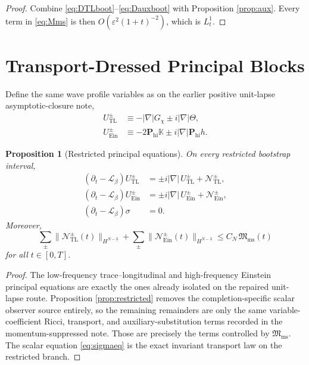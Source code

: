 \documentclass[11pt]{article}
\newcommand{\Ell}{\mathcal{L}}
\newtheorem{proposition}{Proposition}
\begin{document}
\begin{proof}
Combine \eqref{eq:DTLboot}--\eqref{eq:Dauxboot} with Proposition \ref{prop:aux}. Every term in \eqref{eq:Mms} is then \(O(\varepsilon^2(1+t)^{-2})\), which is \(L_t^1\).
\end{proof}

\section{Transport-Dressed Principal Blocks}

Define the same wave profile variables as on the earlier positive unit-lapse asymptotic-closure note,
\begin{align}
U_{\mathrm{TL}}^\pm
&\equiv
-|\nabla|G_\chi \pm i|\nabla|\Theta,
\label{eq:UTL}
\\
U_{\mathrm{Ein}}^\pm
&\equiv
-2\mathbf P_{\mathrm{hi}}\mathbb K
\pm i|\nabla|\mathbf P_{\mathrm{hi}}h.
\label{eq:UEin}
\end{align}

\begin{proposition}[Restricted principal equations]
\label{prop:principal}
On every restricted bootstrap interval,
\begin{align}
(\partial_t-\Ell_\beta)U_{\mathrm{TL}}^\pm
&=
\pm i|\nabla|\,U_{\mathrm{TL}}^\pm
+ \mathcal N_{\mathrm{TL}}^\pm,
\label{eq:UTLeq}
\\
(\partial_t-\Ell_\beta)U_{\mathrm{Ein}}^\pm
&=
\pm i|\nabla|\,U_{\mathrm{Ein}}^\pm
+ \mathcal N_{\mathrm{Ein}}^\pm,
\label{eq:UEineq}
\\
(\partial_t-\Ell_\beta)\sigma
&=0.
\label{eq:sigmaeq}
\end{align}
Moreover,
\begin{equation}
\sum_{\pm}\|\mathcal N_{\mathrm{TL}}^\pm(t)\|_{H^{N-3}}
+ \sum_{\pm}\|\mathcal N_{\mathrm{Ein}}^\pm(t)\|_{H^{N-3}}
\le
C_N\,\mathfrak M_{\mathrm{ms}}(t)
\label{eq:Nbound}
\end{equation}
for all \(t\in[0,T]\).
\end{proposition}

\begin{proof}
The low-frequency trace--longitudinal and high-frequency Einstein principal equations are exactly the ones already isolated on the repaired unit-lapse route. Proposition \ref{prop:restricted} removes the completion-specific scalar observer source entirely, so the remaining remainders are only the same variable-coefficient Ricci, transport, and auxiliary-substitution terms recorded in the momentum-suppressed note. Those are precisely the terms controlled by \(\mathfrak M_{\mathrm{ms}}\). The scalar equation \eqref{eq:sigmaeq} is the exact invariant transport law on the restricted branch.
\end{proof}
\end{document}
